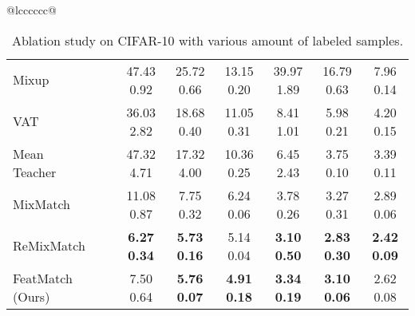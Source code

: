 \documentclass[runningheads]{llncs}
\begin{document}
\begin{table*}[t]
{\begin{tabular}{@{\extracolsep{4pt}}lcccccc@{}}
{\begin{table*}[t]
{\begin{tabular}{@{\extracolsep{4pt}}lccccccc@{}}
Mixup~\cite{zhang2018mixup}                    & & 47.43  0.92 & 25.72  0.66 & 13.15  0.20 & 39.97  1.89 & 16.79  0.63 & 7.96  0.14 \\
VAT~\cite{miyato2018virtual}                   & & 36.03  2.82 & 18.68  0.40 & 11.05  0.31 &  8.41  1.01 &  5.98  0.21 & 4.20  0.15 \\
Mean Teacher~\cite{tarvainen2017mean}          & & 47.32  4.71 & 17.32  4.00 & 10.36  0.25 &  6.45  2.43 &  3.75  0.10 & 3.39  0.11 \\
MixMatch~\cite{berthelot2019mixmatch}          & & 11.08  0.87 &  7.75  0.32 &  6.24  0.06 &  3.78  0.26 &  3.27  0.31 & 2.89  0.06 \\
ReMixMatch~\cite{berthelot2019remixmatch}      & &  \textbf{6.27  0.34} &  \textbf{5.73  0.16} &  5.14  0.04 &  \textbf{3.10  0.50} &  \textbf{2.83  0.30} & \textbf{2.42  0.09} \\
FeatMatch (Ours)                               & &  7.50  0.64 &  \textbf{5.76  0.07} &  \textbf{4.91  0.18} &  \textbf{3.34  0.19} &  \textbf{3.10  0.06} & 2.62  0.08 \\
\bottomrule
\end{tabular}
}
\end{table*}
 \begin{table*}[t]
\centering
\caption{
Ablation study on CIFAR-10 with various amount of labeled samples.
}
\label{table:ablation}
\end{table*}
 
}
\end{tabular}}
\end{table*}
\end{document}
